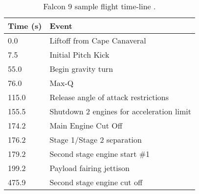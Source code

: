 \begin{table}[!htb]
\centering
\begin{tabular}{|l|l|}
\hline
\rowcolor[HTML]{C0C0C0} 
Time (s) & Event                                     \\ \hline
0.0      & Liftoff from Cape Canaveral               \\ \hline
\rowcolor[HTML]{EFEFEF} 
7.5      & Initial Pitch Kick                        \\ \hline
55.0     & Begin gravity turn                        \\ \hline
\rowcolor[HTML]{EFEFEF} 
76.0     & Max-Q                                     \\ \hline
115.0    & Release angle of attack restrictions      \\ \hline
\rowcolor[HTML]{EFEFEF} 
155.5    & Shutdown 2 engines for acceleration limit \\ \hline
174.2    & Main Engine Cut Off                       \\ \hline
\rowcolor[HTML]{EFEFEF} 
176.2    & Stage 1/Stage 2 separation                \\ \hline
179.2    & Second stage engine start \#1             \\ \hline
\rowcolor[HTML]{EFEFEF} 
199.2    & Payload fairing jettison                  \\ \hline
475.9    & Second stage engine cut off               \\ \hline
\end{tabular}
\caption{Falcon 9 sample flight time-line \cite{Falcon9}.}
\label{tab:Falcon9Timeline}
\end{table}
